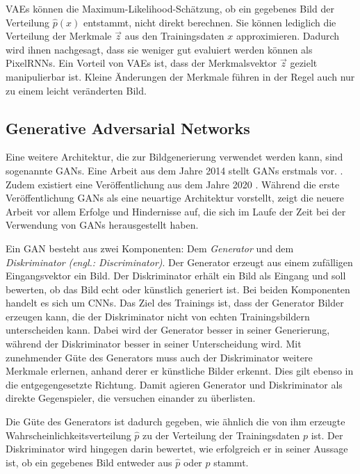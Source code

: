 \acp{VAE} können die Maximum-Likelihood-Schätzung, ob ein gegebenes Bild der Verteilung $\hat{p}(x)$ entstammt, nicht direkt berechnen. Sie können lediglich die Verteilung der Merkmale $\vec{z}$ aus den Trainingsdaten $x$ approximieren. Dadurch wird ihnen nachgesagt, dass sie weniger gut evaluiert werden können als \acp{PixelRNN}. Ein Vorteil von \acsp{VAE} ist, dass der Merkmalsvektor $\vec{z}$ gezielt manipulierbar ist. Kleine Änderungen der Merkmale führen in der Regel auch nur zu einem leicht veränderten Bild. \cite{generativeModelsSurvey}

\label{chap:GANs}
\subsection{Generative Adversarial Networks}
Eine weitere Architektur, die zur Bildgenerierung verwendet werden kann, sind sogenannte \acp{GAN}. Eine Arbeit aus dem Jahre 2014 stellt \acp{GAN} erstmals vor. \cite{Goodfellow-GANs}. Zudem existiert eine Veröffentlichung aus dem Jahre 2020 \cite{GANs}. Während die erste Veröffentlichung \acp{GAN} als eine neuartige Architektur vorstellt, zeigt die neuere Arbeit vor allem Erfolge und Hindernisse auf, die sich im Laufe der Zeit bei der Verwendung von \acp{GAN} herausgestellt haben.

Ein \ac{GAN} besteht aus zwei Komponenten: Dem \emph{Generator} und dem \emph{Diskriminator} \emph{(engl.: Discriminator)}. Der Generator erzeugt aus einem zufälligen Eingangsvektor ein Bild. Der Diskriminator erhält ein Bild als Eingang und soll bewerten, ob das Bild echt oder künstlich generiert ist. Bei beiden Komponenten handelt es sich um \acp{CNN}. Das Ziel des Trainings ist, dass der Generator Bilder erzeugen kann, die der Diskriminator nicht von echten Trainingsbildern unterscheiden kann. Dabei wird der Generator besser in seiner Generierung, während der Diskriminator besser in seiner Unterscheidung wird. Mit zunehmender Güte des Generators muss auch der Diskriminator weitere Merkmale erlernen, anhand derer er künstliche Bilder erkennt. Dies gilt ebenso in die entgegengesetzte Richtung. Damit agieren Generator und Diskriminator als direkte Gegenspieler, die versuchen einander zu überlisten. \cite{GANs}

Die Güte des Generators ist dadurch gegeben, wie ähnlich die von ihm erzeugte Wahrscheinlichkeitsverteilung $\hat{p}$ zu der Verteilung der Trainingsdaten $p$ ist. Der Diskriminator wird hingegen darin bewertet, wie erfolgreich er in seiner Aussage ist, ob ein gegebenes Bild entweder aus $\hat{p}$ oder $p$ stammt. \cite{GANs}

